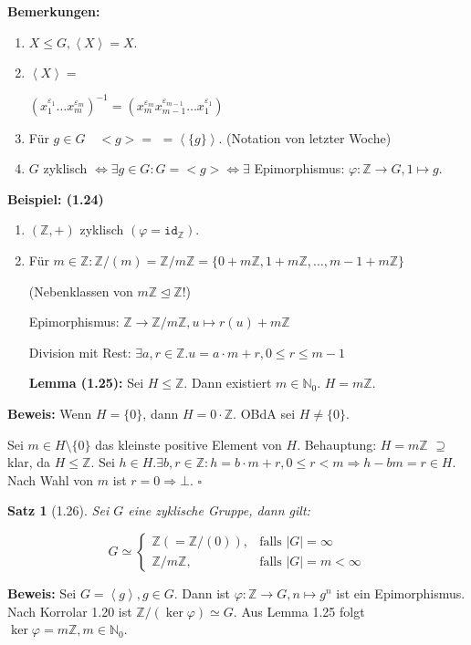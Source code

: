 \documentclass[10pt,a4paper]{article}
\newtheorem{satz}{Satz}
\begin{document}
\textbf{Bemerkungen:}
\begin{enumerate}
\item $X \leqslant G, \left< X \right> = X$.
\item $\left< X \right> =$ 

$(x_1^{\varepsilon _1} \dots x_m^{\varepsilon _m})^{-1} = (x_m^{\varepsilon _m} x_{m-1}^{\varepsilon _{m-1}} \dots x_1^{\varepsilon _1})$

\item Für $g \in G \quad <g> =$  $= \left< \{g\} \right>$. (Notation von letzter Woche)
\item $G$ zyklisch $\Leftrightarrow \exists g \in G: G = < g > \Leftrightarrow \exists$ Epimorphismus: $\varphi : \mathbb{Z} \to G, 1 \mapsto g$.
\end{enumerate}

\textbf{Beispiel: (1.24)} \begin{enumerate}
\item $(\mathbb{Z}, +)$ zyklisch $(\varphi = \texttt{id}_\mathbb{Z})$.
\item Für $m \in \mathbb{Z}: \mathbb{Z} / (m) = \mathbb{Z} / m\mathbb{Z} = \{0 + m\mathbb{Z}, 1 + m\mathbb{Z}, \dots, m-1 + m\mathbb{Z}\}$

(Nebenklassen von $m\mathbb{Z} \trianglelefteq \mathbb{Z}$!) 

Epimorphismus: $\mathbb{Z} \to \mathbb{Z} / m\mathbb{Z}, u \mapsto r(u) + m\mathbb{Z}$

Division mit Rest: $\exists a, r \in \mathbb{Z} . u = a
\cdot m + r, 0 \leqslant r \leqslant m-1$

\textbf{Lemma (1.25):} Sei $H \leqslant \mathbb{Z}$. Dann existiert $m \in \mathbb{N}_0$. $H = m\mathbb{Z}$.
\end{enumerate}

\textbf{Beweis:} Wenn $H = \{0\}$, dann $H = 0 \cdot \mathbb{Z}$. OBdA sei $H \neq \{0\}$. 

Sei $m \in H \setminus \{0\}$ das kleinste positive Element von $H$. Behauptung: $H = m \mathbb{Z}$ \glqq $\supseteq$\grqq klar, da $H \leqslant \mathbb{Z}$. Sei $h \in H . \exists b, r \in \mathbb{Z}: h = b \cdot m + r, 0 \leq r < m \Rightarrow h - bm = r \in H$. Nach Wahl von $m$ ist $r = 0 \Rightarrow \bot$. $\square$

\begin{satz}[1.26]
Sei $G$ eine zyklische Gruppe, dann gilt:

$$ G \simeq \begin{cases}
  \mathbb{Z} \left(= \mathbb{Z} / (0) \right), & \text{falls }\vert G \vert = \infty\\
  \mathbb{Z} / m\mathbb{Z}, & \text{falls }\vert G \vert = m < \infty
\end{cases}$$
\end{satz}
\textbf{Beweis:} Sei $G = \left< g \right>, g \in G$. Dann ist $\varphi: \mathbb{Z} \to G, n \mapsto g^n$ ist ein Epimorphismus. Nach Korrolar 1.20 ist $\mathbb{Z}/(\ker \varphi) \simeq G$. Aus Lemma 1.25 folgt $\ker \varphi = m\mathbb{Z}, m \in \mathbb{N}_0$.
\end{document}
